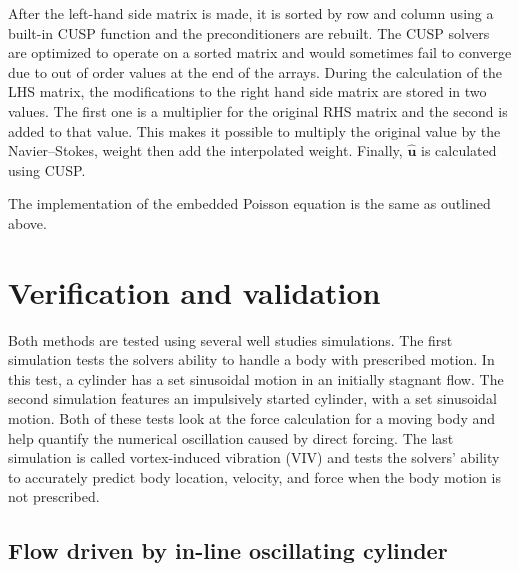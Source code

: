\documentclass[preprint,12pt]{elsarticle}
\begin{document}
After the left-hand side matrix is made, it is sorted by row and column using a built-in CUSP function and the preconditioners are rebuilt.
The CUSP solvers are optimized to operate on a sorted matrix and would sometimes fail to converge due to out of order values at the end of the arrays.
During the calculation of the LHS matrix, the modifications to the right hand side matrix are stored in two values.
The first one is a multiplier for the original RHS matrix and the second is added to that value.
This makes it possible to multiply the original value by the Navier--Stokes, weight then add the interpolated weight.
Finally, $\hat{\textbf{u}}$ is calculated using CUSP.

The implementation of the embedded Poisson equation is the same as outlined above.


\section{Verification and validation}
\label{chapter:Validation}

Both methods are tested using several well studies simulations.
The first simulation tests the solvers ability to handle a body with prescribed motion.
In this test, a cylinder has a set sinusoidal motion in an initially stagnant flow.
The second simulation features an impulsively started cylinder, with a set sinusoidal motion.
Both of these tests look at the force calculation for a moving body and help quantify the numerical oscillation caused by direct forcing.
The last simulation is called vortex-induced vibration (VIV) and tests the solvers' ability to accurately predict body location, velocity, and force when the body motion is not prescribed.

\subsection{Flow driven by in-line oscillating cylinder}
\label{sec:Oscillating Cylinder in no Flow}
\end{document}
